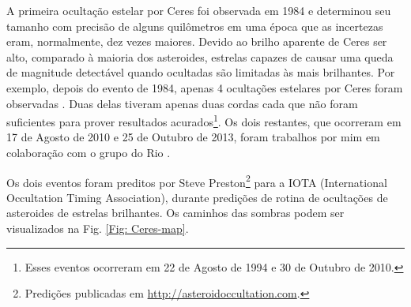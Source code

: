 \documentclass[12pt,a4paper]{monografia}
\begin{document}
A primeira ocultação estelar por Ceres foi observada em 1984 \citep{Millis1987} e determinou seu tamanho com precisão de alguns quilômetros em uma época que as incertezas eram, normalmente, dez vezes maiores. Devido ao brilho aparente de Ceres ser alto, comparado à maioria dos asteroides, estrelas capazes de causar uma queda de magnitude detectável quando ocultadas são limitadas às mais brilhantes. Por exemplo, depois do evento de 1984, apenas 4 ocultações estelares por Ceres foram observadas \citep{Dunham2014}. Duas delas tiveram apenas duas cordas cada que não foram suficientes para prover resultados acurados\footnote{Esses eventos ocorreram em 22 de Agosto de 1994 e 30 de Outubro de 2010.}. Os dois restantes, que ocorreram em 17 de Agosto de 2010 e 25 de Outubro de 2013, foram trabalhos por mim em colaboração com o grupo do Rio \citep[aceito]{GomesJunior2015-Ceres}.

Os dois eventos foram preditos por Steve Preston\footnote{Predições publicadas em \url{http://asteroidoccultation.com}.} para a IOTA (International Occultation Timing Association), durante predições de rotina de ocultações de asteroides de estrelas brilhantes. Os caminhos das sombras podem ser visualizados na Fig. \ref{Fig: Ceres-map}.
\end{document}
